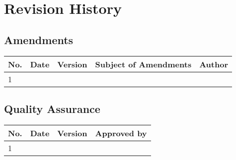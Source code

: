 \documentclass[a4paper]{arrowhead}
\begin{document}
\renewcommand{\bibsection}{\section{References}\label{sec:references}}



\newpage

\section{Revision History}
\label{sec:revision}

\subsection{Amendments}

\noindent\begin{tabularx}{\textwidth}{| p{1cm} | p{2cm} | p{1.25cm} | X | p{4cm} |} \hline
\rowcolor{gray!33} No. & Date & Version & Subject of Amendments & Author \\ \hline

1 & & & & \\ \hline

\end{tabularx}

\subsection{Quality Assurance}

\noindent\begin{tabularx}{\textwidth}{| p{1cm} | p{2cm} | p{1.25cm} | X |} \hline
\rowcolor{gray!33} No. & Date & Version & Approved by \\ \hline

1 & & & \\ \hline

\end{tabularx}
\end{document}

